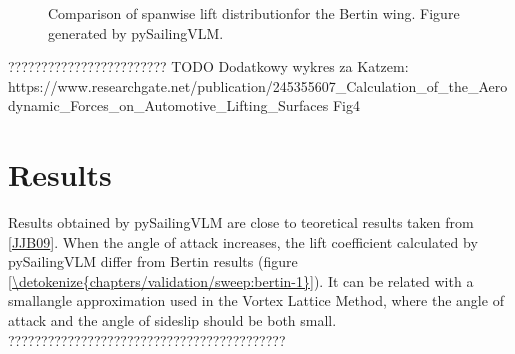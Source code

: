 \documentclass[a4paper,12pt,english]{jupyterBook}
\begin{document}
\begin{figure}[htbp]
\centering
\capstart

\noindent{}
\caption{Comparison of spanwise lift distributionfor the Bertin wing. Figure generated by pySailingVLM.}\label{\detokenize{chapters/validation/sweep:bertin-2}}\end{figure}

\sphinxAtStartPar
????????????????????????
TODO
Dodatkowy wykres za Katzem: https://www.researchgate.net/publication/245355607\_Calculation\_of\_the\_Aerodynamic\_Forces\_on\_Automotive\_Lifting\_Surfaces
Fig4


\part{Results}
\label{\detokenize{chapters/validation/sweep:results}}
\sphinxAtStartPar
Results obtained by pySailingVLM are close to teoretical results taken from {[}\hyperlink{cite.chapters/bibliography:id5}{JJB09}{]}.
When the angle of attack increases, the lift coefficient calculated by pySailingVLM differ from Bertin results (figure \hyperref[\detokenize{chapters/validation/sweep:bertin-1}]{\ref{\detokenize{chapters/validation/sweep:bertin-1}}}). It can be related with a small\sphinxhyphen{}angle approximation used in the Vortex Lattice Method, where the angle of attack and the angle of sideslip should be both small.
??????????????????????????????????????????







\renewcommand{\indexname}{Index}
\printindex
\end{document}
